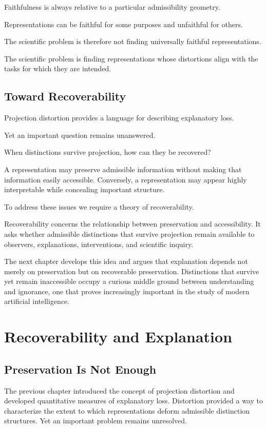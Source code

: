 \documentclass[11pt,oneside,openany]{book}
\begin{document}
Faithfulness is always relative to a particular admissibility geometry.

Representations can be faithful for some purposes and unfaithful for others.

The scientific problem is therefore not finding universally faithful representations.

The scientific problem is finding representations whose distortions align with the tasks for which they are intended.

\section{Toward Recoverability}

Projection distortion provides a language for describing explanatory loss.

Yet an important question remains unanswered.

When distinctions survive projection, how can they be recovered?

A representation may preserve admissible information without making that information easily accessible. Conversely, a representation may appear highly interpretable while concealing important structure.

To address these issues we require a theory of recoverability.

Recoverability concerns the relationship between preservation and accessibility. It asks whether admissible distinctions that survive projection remain available to observers, explanations, interventions, and scientific inquiry.

The next chapter develops this idea and argues that explanation depends not merely on preservation but on recoverable preservation. Distinctions that survive yet remain inaccessible occupy a curious middle ground between understanding and ignorance, one that proves increasingly important in the study of modern artificial intelligence.

\chapter{Recoverability and Explanation}

\section{Preservation Is Not Enough}

The previous chapter introduced the concept of projection distortion and developed quantitative measures of explanatory loss. Distortion provided a way to characterize the extent to which representations deform admissible distinction structures. Yet an important problem remains unresolved.
\end{document}
